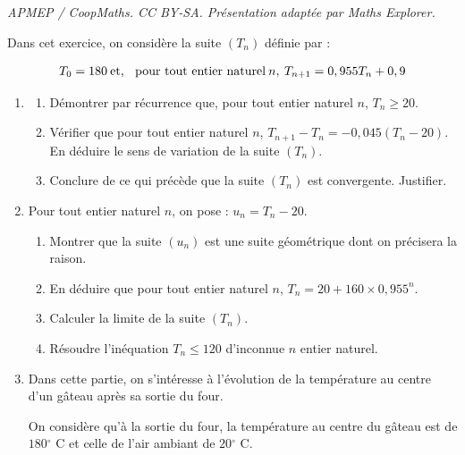 \documentclass[10pt]{article}
\providecommand{\degres}{\ensuremath{^\circ}}
\providecommand{\degres}{{^\circ}}
\begin{document}
\noindent\textit{APMEP / CoopMaths. CC BY-SA. Présentation adaptée par Maths Explorer.}\par\medskip
\medskip

Dans cet exercice, on considère la suite $\left(T_n\right)$ définie par :

\[T_0 = 180 \:\text{et, \: pour tout entier naturel} \:n, \: T_{n+1} = 0,955T_n + 0,9\]

\begin{enumerate}
\item 
	\begin{enumerate}
		\item Démontrer par récurrence que, pour tout entier naturel $n$,\: $T_n \geqslant 20$.
		\item Vérifier que pour tout entier naturel $n$,\: $T_{n+1} -  T_n  = - 0,045\left(T_n - 20\right)$. En déduire le sens de variation de la suite $\left(T_n\right)$.
		\item Conclure de ce qui précède que la suite $\left(T_n\right)$ est convergente. Justifier.
	\end{enumerate}	
\item Pour tout entier naturel $n$, on pose : $u_n =  T_n - 20$.
	\begin{enumerate}
		\item Montrer que la suite $\left(u_n\right)$ est une suite géométrique dont on précisera la raison.
		\item En déduire que pour tout entier naturel $n$, \:$T_n =  20 + 160 \times  0,955^n$.
		\item Calculer la limite de la suite $\left(T_n\right)$.
		\item Résoudre l'inéquation $T_n \leqslant 120$ d'inconnue $n$ entier naturel.
	\end{enumerate}	
\item Dans cette partie, on s'intéresse à l'évolution de la température au centre d'un gâteau après sa sortie du four. 

On considère qu'à la sortie du four, la température au centre du gâteau est de $180 \degres$ C et celle de l'air ambiant de $20 \degres$ C.


\end{enumerate}
\end{document}
